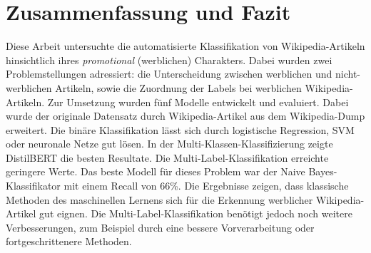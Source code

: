 \section{Zusammenfassung und Fazit}
\label{ZusammenfassungUndFazit}
Diese Arbeit untersuchte die automatisierte Klassifikation von Wikipedia-Artikeln hinsichtlich ihres \textit{promotional} (werblichen) Charakters. Dabei wurden zwei Problemstellungen adressiert: die Unterscheidung zwischen werblichen und nicht-werblichen Artikeln, sowie die Zuordnung der Labels bei werblichen Wikipedia-Artikeln. Zur Umsetzung wurden fünf Modelle entwickelt und evaluiert. Dabei wurde der originale Datensatz durch Wikipedia-Artikel aus dem Wikipedia-Dump erweitert. Die binäre Klassifikation lässt sich durch logistische Regression, SVM oder neuronale Netze gut lösen. In der Multi-Klassen-Klassifizierung zeigte DistilBERT die besten Resultate. Die Multi-Label-Klassifikation erreichte geringere Werte. Das beste Modell für dieses Problem war der Naive Bayes-Klassifikator mit einem Recall von 66\%. Die Ergebnisse zeigen, dass klassische Methoden des maschinellen Lernens sich für die Erkennung werblicher Wikipedia-Artikel gut eignen. Die Multi-Label-Klassifikation benötigt jedoch noch weitere Verbesserungen, zum Beispiel durch eine bessere Vorverarbeitung oder fortgeschrittenere Methoden.
